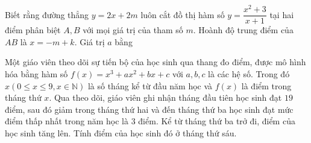 
\begin{bt}%
	Biết rằng  đường thẳng $y=2x+2m$ luôn cắt đồ thị hàm số $y=\dfrac{x^2+3}{x+1}$ tại hai điểm phân biệt $A, B$ với mọi giá trị của tham số $m$. Hoành độ trung điểm của $AB$ là $x=-m+k$. Giá trị $a$ bằng
\end{bt}

\begin{bt}%
	Một giáo viên theo dõi sự tiến bộ của học sinh qua thang đo điểm, được mô hình hóa bằng hàm số $f(x)=x^3+a x^2+b x+c$ với $a, b, c$  là các hệ số. Trong đó $x(0 \leq x \leq 9, x \in \mathbb{N})$ là số tháng kể từ đầu năm học và $f(x)$ là điểm trong tháng thứ $x$. Qua theo dõi, giáo viên ghi nhận tháng đầu tiên học sinh đạt $19$ điểm, sau đó giảm trong tháng thứ hai và đến tháng thứ ba học sinh đạt mức điểm thấp nhất trong năm học là $3$ điểm. Kể từ tháng thứ ba trở đi, điểm của học sinh tăng lên. Tính điểm của học sinh đó ở tháng thứ sáu.
	\end{bt}

